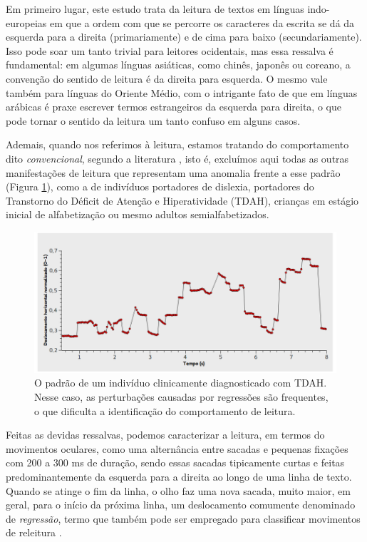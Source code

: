\documentclass[12pt]{article}
\begin{document}
		Em primeiro lugar, este estudo trata da leitura de textos em línguas indo-europeias em que a ordem com que se percorre os caracteres da escrita se dá da esquerda para a direita (primariamente) e de cima para baixo (secundariamente). Isso pode soar um tanto trivial para leitores ocidentais, mas essa ressalva é fundamental: em algumas línguas asiáticas, como chinês, japonês ou coreano, a convenção do sentido de leitura é da direita para esquerda. O mesmo vale também para línguas do Oriente Médio, com o intrigante fato de que em línguas arábicas é praxe escrever termos estrangeiros da esquerda para direita, o que pode tornar o sentido da leitura um tanto confuso em alguns casos.
		
		Ademais, quando nos referimos à leitura, estamos tratando do comportamento dito \textit{convencional}, segundo a literatura \cite{Pavlidis-1981}, isto é, excluímos aqui todas as outras manifestações de leitura que representam uma anomalia frente a esse padrão (Figura \ref{fig:dyslexia}), como a de indivíduos portadores de dislexia, portadores do Transtorno do Déficit de Atenção e Hiperatividade (TDAH), crianças em estágio inicial de alfabetização ou mesmo adultos semialfabetizados.
		
		\begin{figure}[!ht]
			\centering
			\includegraphics[width=14cm]{imgs/leitura_horizontal2.png}
			\caption{\footnotesize {O padrão de um indivíduo clinicamente diagnosticado com TDAH. Nesse caso, as perturbações causadas por regressões são frequentes, o que dificulta a identificação do comportamento de leitura.}}
			\label{fig:dyslexia}
			\vspace{5mm}
		\end{figure}
		
		Feitas as devidas ressalvas, podemos caracterizar a leitura, em termos do movimentos oculares, como uma alternância entre sacadas e pequenas fixações com 200 a 300 ms de duração, sendo essas sacadas tipicamente curtas e feitas predominantemente da esquerda para a direita ao longo de uma linha de texto. Quando se atinge o fim da linha, o olho faz uma nova sacada, muito maior, em geral, para o início da próxima linha, um deslocamento comumente denominado de \textit{regressão}, termo que também pode ser empregado para classificar movimentos de releitura \cite{Rayner-2001}.
		
\end{document}
